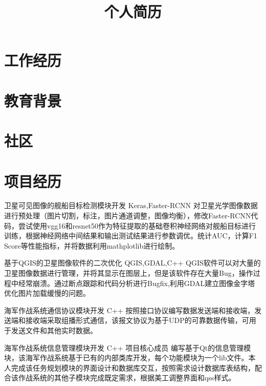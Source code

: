 \documentclass[11pt,a4paper]{moderncv}
\title{个人简历}                      %
\begin{document}
\maketitle

\section{工作经历}

\section{教育背景}


\section{社区}

\section{项目经历}
\renewcommand{\baselinestretch}{1.2}
{卫星可见图像的舰船目标检测模块开发}
{Keras,Faster-RCNN}
{}{}
{对卫星光学图像数据进行预处理（图片切割，标注，图片通道调整，图像均衡），修改Faster-RCNN代码，尝试使用vgg16和resnet50作为特征提取的基础卷积神经网络对舰船目标进行训练，根据神经网络中间结果和输出测试结果进行参数调优。统计AUC，计算F1 Score等性能指标，并将数据利用mathplotlib进行绘制。}

{基于QGIS的卫星图像软件的二次优化}
{QGIS,GDAL,C++}
{}{}
{QGIS软件可以对大量的卫星图像数据进行管理，并将其显示在图层上，但是该软件存在大量Bug，操作过程中经常崩溃。通过断点跟踪和代码分析进行Bugfix,利用GDAL建立图像金字塔优化图片加载缓慢的问题。}

{海军作战系统通信协议模块开发}
{C++}
{}{}
{按照接口协议编写数据发送端和接收端，发送端和接收端采取组播形式通信，该报文协议为基于UDP的可靠数据传输，可用于发送文件和其他实时数据。}

{海军作战系统信息管理模块开发}
{C++}
{}{项目核心成员}
{编写基于Qt的信息管理模块，该海军作战系统基于已有的内部类库开发，每个功能模块为一个lib文件。本人完成该任务规划模块的界面设计和数据库交互，按照需求设计数据库表结构，配合该作战系统的其他子模块完成既定需求，根据美工调整界面和qss样式。}
\end{document}
